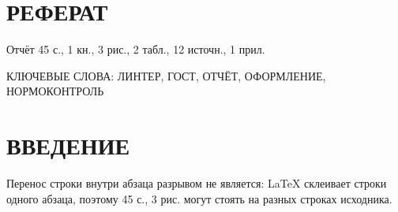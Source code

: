 \section*{РЕФЕРАТ}

Отчёт 45 с., 1 кн., 3 рис., 2 табл., 12 источн., 1 прил.

КЛЮЧЕВЫЕ СЛОВА: ЛИНТЕР, ГОСТ, ОТЧЁТ, ОФОРМЛЕНИЕ, НОРМОКОНТРОЛЬ

\section*{ВВЕДЕНИЕ}

Перенос строки внутри абзаца разрывом не является: LaTeX склеивает
строки одного абзаца, поэтому 45 с., 3 рис. могут стоять на разных
строках исходника.
